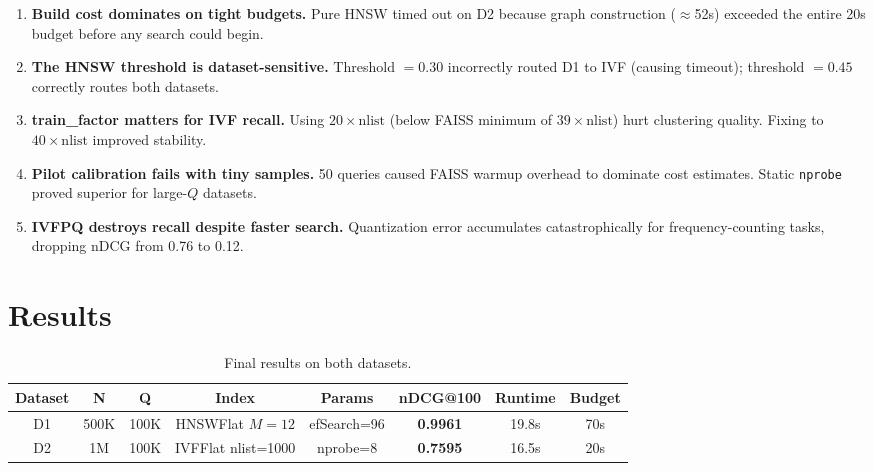 \documentclass[11pt,a4paper]{article}
\makeatletter
\newcommand{\ndcg}{nDCG@100}
\makeatother
\begin{document}
\begin{enumerate}[leftmargin=1.5em, label=\textbf{\arabic*.}]
  \item \textbf{Build cost dominates on tight budgets.} Pure HNSW timed out
        on D2 because graph construction ($\approx$52s) exceeded the entire
        20s budget before any search could begin.

  \item \textbf{The HNSW threshold is dataset-sensitive.} Threshold $= 0.30$
        incorrectly routed D1 to IVF (causing timeout); threshold $= 0.45$
        correctly routes both datasets.

  \item \textbf{train\_factor matters for IVF recall.} Using $20\times\text{nlist}$
        (below FAISS minimum of $39\times\text{nlist}$) hurt clustering quality.
        Fixing to $40\times\text{nlist}$ improved stability.

  \item \textbf{Pilot calibration fails with tiny samples.} 50 queries caused
        FAISS warmup overhead to dominate cost estimates. Static \texttt{nprobe}
        proved superior for large-$Q$ datasets.

  \item \textbf{IVFPQ destroys recall despite faster search.} Quantization
        error accumulates catastrophically for frequency-counting tasks, dropping
        nDCG from 0.76 to 0.12.
\end{enumerate}

\section{Results}

\begin{table}[H]
\centering
\renewcommand{\arraystretch}{1.4}
\caption{Final results on both datasets.}
\label{tab:results}
\begin{tabular}{cccccccc}
\toprule
\rowcolor{medblue}
\color{white}\textbf{Dataset} &
\color{white}\textbf{N} &
\color{white}\textbf{Q} &
\color{white}\textbf{Index} &
\color{white}\textbf{Params} &
\color{white}\textbf{\ndcg} &
\color{white}\textbf{Runtime} &
\color{white}\textbf{Budget} \\
\midrule
\rowcolor{green!10}
D1 & 500K & 100K & HNSWFlat $M=12$ & efSearch=96 & \textbf{0.9961} & 19.8s & 70s \\
\rowcolor{orange!10}
D2 & 1M   & 100K & IVFFlat nlist=1000 & nprobe=8 & \textbf{0.7595} & 16.5s & 20s \\
\bottomrule
\end{tabular}
\end{table}
\end{document}
